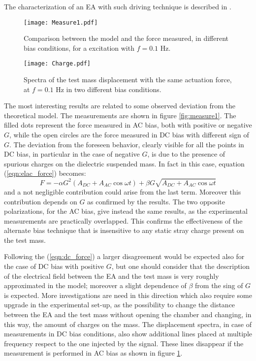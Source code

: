 {The characterization of an EA with such driving technique is described in \cite{ElDrive}.
\begin{figure}
\begin{minipage}{0.47\textwidth}
\begin{center}
\texttt{[image: Measure1.pdf]}   
\caption{ \label{fig:measure1} Comparison between the model and the force measured, in different bias conditions, for a excitation with $f=0.1$ Hz.}
\end{center}
\end{minipage}
\hspace{0.5cm}
\begin{minipage}{0.47\textwidth}
\begin{center}
\texttt{[image: Charge.pdf]}
\caption{ \label{fig:charge} Spectra of the test mass displacement with the same actuation force, at $f=0.1$ Hz in two different bias conditions.}
\end{center}
\end{minipage}
\end{figure}
The most interesting results are related to some observed deviation from the theoretical model. The measurements are shown in figure \ref{fig:measure1}. The filled dots represent the force measured in AC bias, both with positive or negative $G$, while the open circles are the force measured in DC bias with different sign of $G$. The deviation from the foreseen behavior, clearly visible for all the points in DC bias, in particular in the case of negative $G$, is due to the presence of spurious charges on the dielectric suspended mass. In fact in this case, equation (\ref{eqn:elac_force}) becomes:
\begin{equation}
\label{eqn:dc_force}
F=-\alpha G^2\left( A_{DC}+A_{AC}\cos{\omega t}\right)+\beta G \sqrt{A_{DC}+A_{AC}\cos{\omega t}}
\end{equation}
and a not negligible contribution could arise from the last term. Moreover this contribution depends on $G$ as confirmed by the results. The two opposite polarizations, for the AC bias, give instead the same results, as the experimental measurements are practically overlapped. This confirms the effectiveness of the alternate bias technique that is insensitive to any static stray charge present on the test mass.

Following the (\ref{eqn:dc_force}) a larger disagreement would be expected also for the case of DC bias with positive $G$, but  one should consider that the description of the electrical field between the EA and the test mass is very roughly approximated in the model; moreover a slight dependence of $\beta$ from the sing of $G$ is expected. More investigations are need in this direction which also require some upgrade in the experimental set-up, as the possibility to change the distance between the EA and the test mass without opening the chamber and changing, in this way, the amount of charges on the mass.
The displacement spectra, in case of measurements in DC bias conditions, also show additional lines placed at multiple frequency respect to the one injected by the signal. These lines disappear if the measurement is performed in AC bias as shown in figure \ref{fig:charge}.

}
